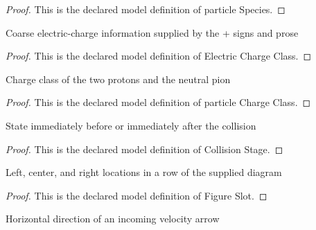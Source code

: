 \begin{proof}
  This is the declared model definition of particle Species.
\end{proof}
\begin{definition}
  \label{def:physics:phyx-mini-0511:phyxminiproblems-problemphyxmini0511-electricchargeclass}
  Coarse electric-charge information supplied by the + signs and prose
\end{definition}
\begin{proof}
  This is the declared model definition of Electric Charge Class.
\end{proof}
\begin{definition}
  \label{def:physics:phyx-mini-0511:phyxminiproblems-problemphyxmini0511-particlechargeclass}
  Charge class of the two protons and the neutral pion
\end{definition}
\begin{proof}
  This is the declared model definition of particle Charge Class.
\end{proof}
\begin{definition}
  \label{def:physics:phyx-mini-0511:phyxminiproblems-problemphyxmini0511-collisionstage}
  State immediately before or immediately after the collision
\end{definition}
\begin{proof}
  This is the declared model definition of Collision Stage.
\end{proof}
\begin{definition}
  \label{def:physics:phyx-mini-0511:phyxminiproblems-problemphyxmini0511-figureslot}
  Left, center, and right locations in a row of the supplied diagram
\end{definition}
\begin{proof}
  This is the declared model definition of Figure Slot.
\end{proof}
\begin{definition}
  \label{def:physics:phyx-mini-0511:phyxminiproblems-problemphyxmini0511-horizontaldirection}
  Horizontal direction of an incoming velocity arrow
\end{definition}
